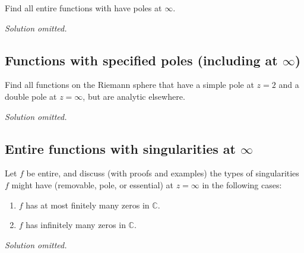 \begin{problem}[?]

Find all entire functions with have poles at \(\infty\).

\end{problem}

\emph{Solution omitted.}

\hypertarget{functions-with-specified-poles-including-at-infty}{%
\subsection{\texorpdfstring{Functions with specified poles (including at
\(\infty\))}{Functions with specified poles (including at \textbackslash infty)}}\label{functions-with-specified-poles-including-at-infty}}

\begin{problem}[?]

Find all functions on the Riemann sphere that have a simple pole at
\(z=2\) and a double pole at \(z=\infty\), but are analytic elsewhere.

\end{problem}

\emph{Solution omitted.}

\hypertarget{entire-functions-with-singularities-at-infty}{%
\subsection{\texorpdfstring{Entire functions with singularities at
\(\infty\)}{Entire functions with singularities at \textbackslash infty}}\label{entire-functions-with-singularities-at-infty}}

\begin{problem}[?]

Let \(f\) be entire, and discuss (with proofs and examples) the types of
singularities \(f\) might have (removable, pole, or essential) at
\(z=\infty\) in the following cases:

\begin{enumerate}
\def\labelenumi{\arabic{enumi}.}
\tightlist
\item
  \(f\) has at most finitely many zeros in \({\mathbb{C}}\).
\item
  \(f\) has infinitely many zeros in \({\mathbb{C}}\).
\end{enumerate}

\end{problem}

\emph{Solution omitted.}

